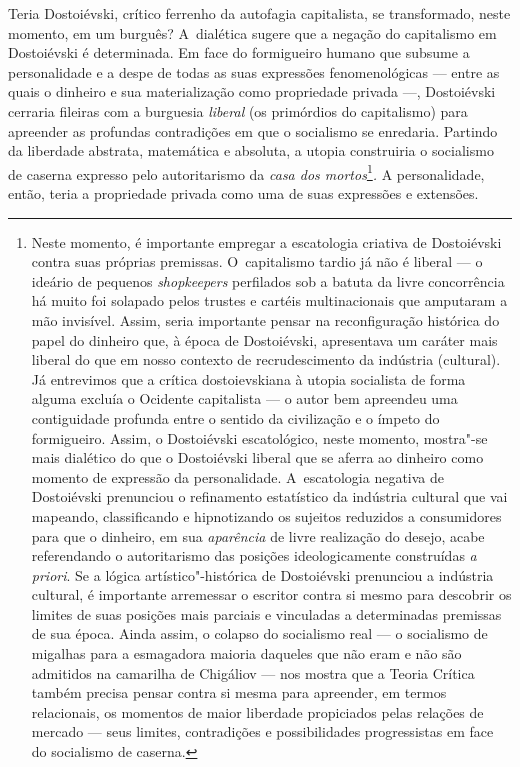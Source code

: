 Teria Dostoiévski, crítico ferrenho da autofagia capitalista, se
transformado, neste momento, em um burguês? A~dialética sugere que a
negação do capitalismo em Dostoiévski é determinada. Em face do
formigueiro humano que subsume a personalidade e a despe de todas as
suas expressões fenomenológicas --- entre as quais o dinheiro e sua
materialização como propriedade privada ---, Dostoiévski cerraria
fileiras com a burguesia \emph{liberal} (os primórdios do capitalismo)
para apreender as profundas contradições em que o socialismo se
enredaria. Partindo da liberdade abstrata, matemática e absoluta, a
utopia construiria o socialismo de caserna expresso pelo autoritarismo
da \emph{casa dos mortos}\footnote{Neste momento, é importante empregar
  a escatologia criativa de Dostoiévski contra suas próprias premissas.
  O~capitalismo tardio já não é liberal --- o ideário de pequenos
  \emph{shopkeepers} perfilados sob a batuta da livre concorrência há
  muito foi solapado pelos trustes e cartéis multinacionais que
  amputaram a mão invisível. Assim, seria importante pensar na
  reconfiguração histórica do papel do dinheiro que, à época de
  Dostoiévski, apresentava um caráter mais liberal do que em nosso
  contexto de recrudescimento da indústria (cultural). Já entrevimos que
  a crítica dostoievskiana à utopia socialista de forma alguma excluía o
  Ocidente capitalista --- o autor bem apreendeu uma contiguidade
  profunda entre o sentido da civilização e o ímpeto do formigueiro.
  Assim, o Dostoiévski escatológico, neste momento, mostra"-se mais
  dialético do que o Dostoiévski liberal que se aferra ao dinheiro como
  momento de expressão da personalidade. A~escatologia negativa de
  Dostoiévski prenunciou o refinamento estatístico da indústria cultural
  que vai mapeando, classificando e hipnotizando os sujeitos reduzidos a
  consumidores para que o dinheiro, em sua \emph{aparência} de livre
  realização do desejo, acabe referendando o autoritarismo das posições
  ideologicamente construídas \emph{a priori}. Se a lógica
  artístico"-histórica de Dostoiévski prenunciou a indústria cultural, é
  importante arremessar o escritor contra si mesmo para descobrir os
  limites de suas posições mais parciais e vinculadas a determinadas
  premissas de sua época. Ainda assim, o colapso do socialismo real --- o
  socialismo de migalhas para a esmagadora maioria daqueles que não eram
  e não são admitidos na camarilha de Chigáliov --- nos mostra que a
  Teoria Crítica também precisa pensar contra si mesma para apreender,
  em termos relacionais, os momentos de maior liberdade propiciados
  pelas relações de mercado --- seus limites, contradições e
  possibilidades progressistas em face do socialismo de caserna.}\emph{.}
A personalidade, então, teria a propriedade privada como uma de suas
expressões e extensões.

